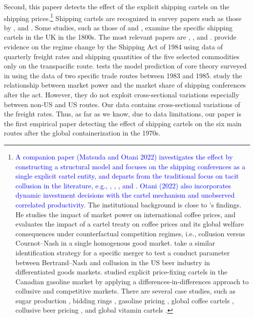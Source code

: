 \documentclass[11pt]{article}
\begin{document}
Second, this papeer detects the effect of the explicit shipping cartels on the shipping prices.\footnote{\textcolor{blue}{A companion paper (Matsuda and Otani 2022) investigates the effect by constructing a structural model and focuses on the shipping conferences as a single explicit cartel entity, and departs from the traditional focus on tacit collusion in the literature, e.g., \cite{porter1983study}, \cite{bresnahan1987competition}, \cite{miller2017understanding}, and \cite{byrne2019learning}. Otani (2022) also incorporates dynamic investment decisions with the cartel mechanism and unobserved correlated productivity.} The institutional background is close to \cite{igami2015market}'s findings. He studies the impact of market power on international coffee prices, and evaluates the impact of a cartel treaty on coffee prices and its global welfare consequences under counterfactual competition regimes, i.e., collusion versus Cournot–Nash in a single homogenous good market. \cite{miller2017understanding} take a similar identification strategy for a specific merger to test a conduct parameter between Bertrand–Nash and collusion in the US beer industry in differentiated goods markets. \cite{clark2013collusion,clark2014effect} studied explicit price-fixing cartels in the Canadian gasoline market by applying a differences-in-differences approach to collusive and competitive markets. There are several case studies, such as sugar production \citep{genesove1998testing,genesove2001rules}, bidding rings \citep{asker2010study}, gasoline pricing \citep{clark2013collusion,clark2014effect}, global coffee cartels \citep{igami2015market}, collusive beer pricing \citep{miller2017understanding}, and global vitamin cartels \citep{igami2021measuring}.} Shipping cartels are recognized in survey papers such as those by \cite{levenstein2006determines}, and \cite{asker2021}. Some studies, such as those of \cite{morton1997entry} and \cite{podolny1999social}, examine the specific shipping cartels in the UK in the 1800s. The most relevant papers are \cite{wilson1991some}, \cite{pirrong1992application}, and \cite{clyde1998market}. \cite{wilson1991some} provide evidence on the regime change by the Shipping Act of 1984 using data of quarterly freight rates and shipping quantities of the five selected commodities only on the transpacific route. \cite{pirrong1992application} tests the model prediction of core theory surveyed in \cite{sjostrom2013competition} using the data of two specific trade routes between 1983 and 1985. \cite{clyde1998market} study the relationship between market power and the market share of shipping conferences after the act. However, they do not exploit cross-sectional variations especially between non-US and US routes. Our data contains cross-sectional variations of the freight rates. Thus, as far as we know, due to data limitations, our paper is the first empirical paper detecting the effect of shipping cartels on the six main routes after the global containerization in the 1970s.
\end{document}
